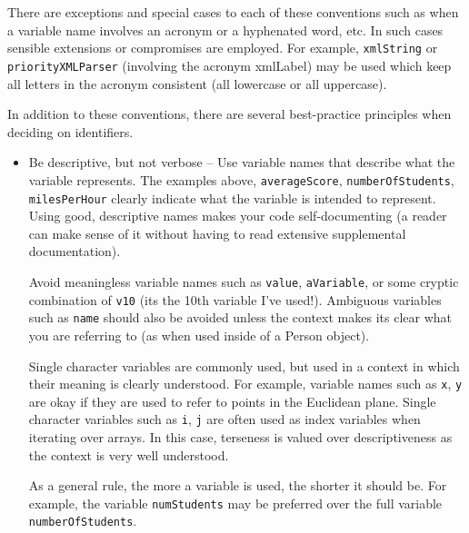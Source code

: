 There are exceptions and special cases to each of these conventions such
as when a variable name involves an acronym or a hyphenated word, etc.  In such
cases sensible extensions or compromises are employed.  For example, 
\texttt{xmlString} or \texttt{priorityXMLParser} (involving the acronym 
\gls{xmlLabel}) may be used which keep all letters in the acronym consistent (all lowercase or all uppercase).

In addition to these conventions, there are several best-practice principles when deciding
on identifiers.
\begin{itemize}
  \item Be descriptive, but not verbose -- Use variable names that describe what the
  	variable represents.  The examples above, \texttt{averageScore}, 
	\texttt{numberOfStudents}, \texttt{milesPerHour} clearly indicate
	what the variable is intended to represent.  Using good, descriptive names makes
	your code self-documenting (a reader can make sense of it without having to 
	read extensive supplemental documentation).

	Avoid meaningless variable names such as \texttt{value}, \texttt{aVariable}, 
	or some cryptic combination of \texttt{v10} (its the 10th variable I've used!).  
	Ambiguous variables such as \texttt{name} should also be avoided unless the
	context makes its clear what you are referring to (as when used inside of a Person
	object).
	
	Single character variables are commonly used, but used in a context in which their
	meaning is clearly understood.  For example, variable names such as \texttt{x},
	\texttt{y} are okay if they are used to refer to points in the Euclidean plane.  
	Single character variables such as \texttt{i}, \texttt{j} are often used
	as index variables when iterating over arrays.  In this case, terseness is valued over
	descriptiveness as the context is very well understood. 
	
	As a general rule, the more a variable is used, the shorter it should be.  For example,
	the variable \texttt{numStudents} may be preferred over the full variable 
	\texttt{numberOfStudents}.
	

\end{itemize}

